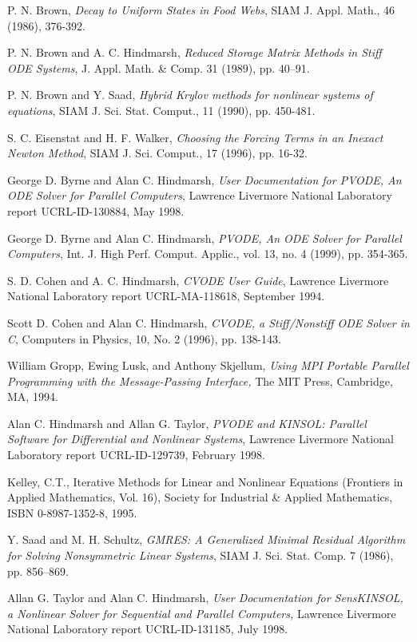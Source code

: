 \documentclass[11pt]{article}
\begin{document}
\begin{thebibliography}{99}

 P. N. Brown, {\em Decay to Uniform States in Food Webs},
SIAM J. Appl. Math., 46 (1986), 376-392.

 P. N. Brown and A. C. Hindmarsh, {\it Reduced Storage
Matrix Methods in Stiff ODE Systems}, J. Appl. Math. \& Comp. 31
(1989), pp. 40--91.

 P. N. Brown and Y. Saad, {\it Hybrid Krylov methods
for nonlinear systems of equations}, SIAM J. Sci. Stat. Comput., 11
(1990), pp. 450-481.

 S. C. Eisenstat and H. F. Walker, {\it Choosing the
Forcing Terms in an Inexact Newton Method}, SIAM J. Sci. Comput., 17
(1996), pp. 16-32.

 George D. Byrne and Alan C. Hindmarsh, {\it
User Documentation for PVODE, An ODE Solver for Parallel Computers},
Lawrence Livermore National Laboratory report UCRL-ID-130884, May 1998.

 George D. Byrne and Alan C. Hindmarsh, {\it PVODE, An
ODE Solver for Parallel Computers}, Int. J. High Perf. Comput. Applic., 
vol. 13, no. 4 (1999), pp. 354-365.

 S. D. Cohen and A. C. Hindmarsh, {\it CVODE User
Guide}, Lawrence Livermore National Laboratory report UCRL-MA-118618,
September 1994.

 Scott D. Cohen and Alan C. Hindmarsh, {\it CVODE, a
Stiff/Nonstiff ODE Solver in C}, Computers in Physics, 10, No. 2
(1996), pp. 138-143.

  William Gropp, Ewing Lusk, and Anthony Skjellum, {\it
Using MPI Portable Parallel Programming with the Message-Passing
Interface, }The MIT Press, Cambridge, MA, 1994.

 Alan C. Hindmarsh and Allan G. Taylor, {\it PVODE and
KINSOL: Parallel Software for Differential and Nonlinear Systems},
Lawrence Livermore National Laboratory report UCRL-ID-129739, February
1998.

 Kelley, C.T., Iterative Methods for Linear and
Nonlinear Equations (Frontiers in Applied Mathematics, Vol. 16),
Society for Industrial \& Applied Mathematics, ISBN 0-8987-1352-8, 1995.

 Y. Saad and M. H. Schultz, {\it GMRES: A Generalized
Minimal Residual Algorithm for Solving Nonsymmetric Linear Systems},
SIAM J. Sci. Stat. Comp. 7 (1986), pp. 856--869.

 Allan G. Taylor and Alan C. Hindmarsh, {\it
User Documentation for SensKINSOL, a Nonlinear Solver for Sequential
and Parallel Computers, } Lawrence Livermore National Laboratory report
UCRL-ID-131185, July 1998.

\end{thebibliography}
\end{document}
